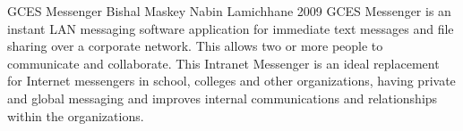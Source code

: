  \begin{conf-abstract}[]
{GCES Messenger}
{
Bishal Maskey
Nabin Lamichhane
}
{2009}
GCES Messenger is an instant LAN messaging software application for immediate text messages and file sharing over a corporate network. This allows two or more people to
 communicate and collaborate. This Intranet Messenger is an ideal replacement for Internet messengers in school, colleges and other organizations, having private and 
global messaging and improves internal communications and relationships within the organizations.
  \end{conf-abstract}
